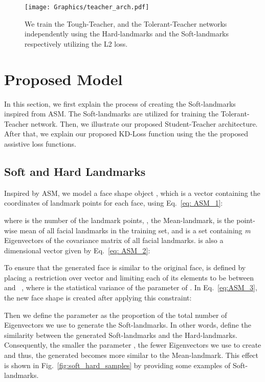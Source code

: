 \documentclass[times,twocolumn,final,authoryear]{elsarticle}
\begin{document}
\begin{figure}[t!]
  \centering
  \texttt{[image: Graphics/teacher\_arch.pdf]}
  \caption{We train the Tough-Teacher, and the Tolerant-Teacher networks independently using the Hard-landmarks and the Soft-landmarks respectively utilizing the L2 loss. }
  \label{fig:general_framework}
\end{figure}


\section{Proposed Model}
\label{sec:proposedModel}
In this section, we first explain the process of creating the Soft-landmarks inspired from ASM. The Soft-landmarks are utilized for training the Tolerant-Teacher network. Then, we illustrate our proposed Student-Teacher architecture. After that, we explain our proposed KD-Loss function using the the proposed assistive loss functions.

\subsection{Soft and Hard Landmarks} \label{sec:lblCreation}
Inspired by ASM, we model a face shape object , which is a vector containing the coordinates of landmark points for each face, using Eq.~\ref{eq: ASM_1}:

where  is the number of the landmark points, , the Mean-landmark, is the point-wise mean of all facial landmarks in the training set, and  is a set containing \textit{m} Eigenvectors of the covariance matrix of all facial landmarks.  is also a dimensional vector given by Eq.~\ref{eq: ASM_2}:

To ensure that the generated face is similar to the original face,  is defined by placing a restriction over  vector and limiting each of its elements to be between  and ~\cite{cootes2000introduction}, where  is the statistical variance of the  parameter of . In Eq.~\ref{eq:ASM_3}, the new face shape  is created after applying this constraint:

Then we define the parameter  as the proportion of the total number of Eigenvectors we use to generate the Soft-landmarks. In other words,  define the similarity between the generated Soft-landmarks and the Hard-landmarks. Consequently, the smaller the parameter , the fewer Eigenvectors we use to create  and thus, the generated  becomes more similar to the Mean-landmark. This effect is shown in Fig.~\ref{fig:soft_hard_samples} by providing some examples of Soft-landmarks.
\end{document}
